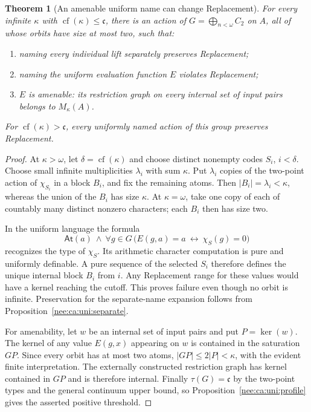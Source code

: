 \documentclass[11pt,letterpaper]{article}
\numberwithin{equation}{section}
\theoremstyle{plain}
\newtheorem{theorem}{Theorem}[section]
\theoremstyle{definition}
\theoremstyle{remark}
\newcommand{\At}{\mathsf{At}}
\newcommand{\cf}{\operatorname{cf}}
\newcommand{\kerat}{\operatorname{ker}}
\newcommand{\cont}{\mathfrak c}
\newcommand{\Mk}{M_\kappa(A)}
\begin{document}
\begin{theorem}[An amenable uniform name can change Replacement]
\label{nee:ca:uni:two_point}
For every infinite $\kappa$ with $\cf(\kappa)\leq\cont$, there is an
action of $G=\bigoplus_{n<\omega}C_2$ on $A$, all of whose orbits have
size at most two, such that:
\begin{enumerate}
\item naming every individual lift separately preserves Replacement;
\item naming the uniform evaluation function $E$ violates Replacement;
\item $E$ is amenable: its restriction graph on every internal set of
input pairs belongs to $\Mk$.
\end{enumerate}
For $\cf(\kappa)>\cont$, every uniformly named action of this group
preserves Replacement.
\end{theorem}
\begin{proof}
At $\kappa>\omega$, let $\delta=\cf(\kappa)$ and choose distinct
nonempty codes $S_i$, $i<\delta$.  Choose small infinite multiplicities
$\lambda_i$ with sum $\kappa$.  Put $\lambda_i$ copies of the two-point
action of $\chi_{S_i}$ in a block $B_i$, and fix the remaining atoms.
Then $|B_i|=\lambda_i<\kappa$, whereas the union of the $B_i$ has size
$\kappa$.  At $\kappa=\omega$, take one copy of each of countably many
distinct nonzero characters; each $B_i$ then has size two.

In the uniform language the formula
\begin{equation}\label{nee:ca:uni:eq:recognition}
 \At(a)\ \wedge\ \forall g\in G\,
 \bigl(E(g,a)=a\ \longleftrightarrow\ \chi_S(g)=0\bigr)
\end{equation}
recognizes the type of $\chi_S$.  Its arithmetic character computation
is pure and uniformly definable.  A pure sequence of the selected
$S_i$ therefore defines the unique internal block $B_i$ from $i$.
Any Replacement range for these values would have a kernel reaching
the cutoff.  This proves failure even though no orbit is infinite.
Preservation for the separate-name expansion follows from
Proposition~\ref{nee:ca:uni:separate}.

For amenability, let $w$ be an internal set of input pairs and put
$P=\kerat(w)$.  The kernel of any value $E(g,x)$ appearing on $w$ is
contained in the saturation $GP$.  Since every orbit has at most two
atoms, $|GP|\leq2|P|<\kappa$, with the evident finite interpretation.
The externally constructed restriction graph has kernel contained in
$GP$ and is therefore internal.  Finally $\tau(G)=\cont$ by the
two-point types and the general continuum upper bound, so
Proposition~\ref{nee:ca:uni:profile} gives the asserted positive threshold.
\end{proof}
\end{document}
